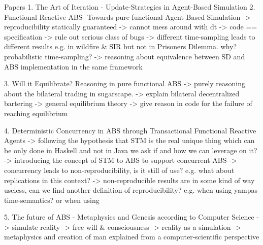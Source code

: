 Papers
1. The Art of Iteration - Update-Strategies in Agent-Based Simulation
2. Functional Reactive ABS- Towards pure functional Agent-Based Simulation
	-> reproducibility statically guaranteed
	-> cannot mess around with dt
	-> code == specification
	-> rule out serious class of bugs
	-> different time-sampling leads to different results e.g. in wildfire \& SIR but not in Prisoners Dilemma. why? probabilistic time-sampling?
	-> reasoning about equivalence between SD and ABS implementation in the same framework

3. Will it Equilibrate? Reasoning in pure functional ABS
	-> purely reasoning about the bilateral trading in sugarscape.
	-> explain bilateral decentralized bartering
	-> general equilibrium theory
	-> give reason in code for the failure of reaching equilibrium

4. Deterministic Concurrency in ABS through Transactional Functional Reactive Agents
	-> following the hypothesis that STM is the real unique thing which can be only done in Haskell and not in Java we ask if and how we can leverage on it?
	-> introducing the concept of STM to ABS to support concurrent ABS
	-> concurrency leads to non-reproducibility, is it still of use? e.g. what about replications in this context?
	-> non-reproducible results are in some kind of way useless, can we find another definition of reproducibility? e.g. when using yampas time-semantics? or when using 

5. The future of ABS - Metaphysics and Genesis according to Computer Science
	-> simulate reality
	-> free will \& consciousness 
	-> reality as a simulation
	-> metaphysics and creation of man explained from a computer-scientific perspective

